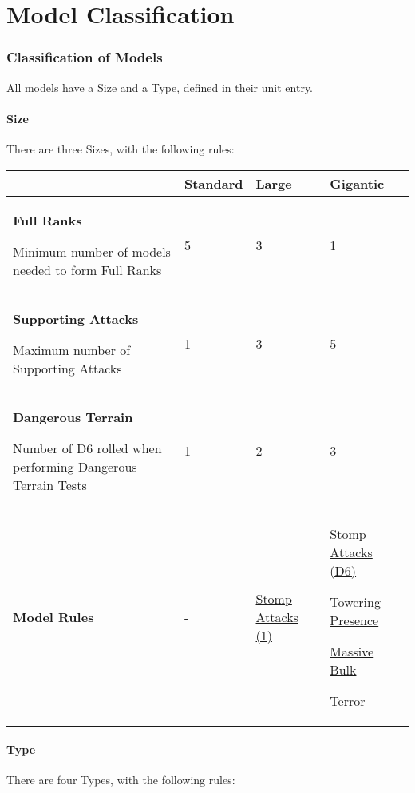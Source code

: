 \part{Model Classification}
\label{model_classification}

\section{Classification of Models}

All models have a Size and a Type, defined in their unit entry.

\subsection{Size}
\label{size}

There are three Sizes, with the following rules:

\begin{center}
\begin{tabular}{P{5cm} P{3cm} P{3cm} P{3cm}}
  &%
  \textbf{Standard} &%
  \textbf{Large} &%
  \textbf{Gigantic} \\
  \midrule
  \textbf{Full Ranks}\par
  {\normalfontsize Minimum number of models needed to form Full Ranks}&%
  5 &%
  3 &%
  1 \\
  \textbf{Supporting Attacks}\par
  {\normalfontsize Maximum number of Supporting Attacks}&%
  1&%
  3&%
  5\\
  \textbf{Dangerous Terrain}\par
  {\normalfontsize Number of D6 rolled when performing Dangerous Terrain Tests}&%
  1&%
  2&%
  3\\
  \textbf{Model Rules} &%
  - &%
  \hyperref[stomp_attacks]{Stomp Attacks (1)}&
  \hyperref[stomp_attacks]{Stomp Attacks (D6)}\par
  \hyperref[towering_presence]{Towering Presence}\par
  \hyperref[massive_bulk]{Massive Bulk}\par
  \hyperref[terror]{Terror}\\
\end{tabular}
\end{center}

\subsection{Type}
\label{type}

There are four Types, with the following rules:

